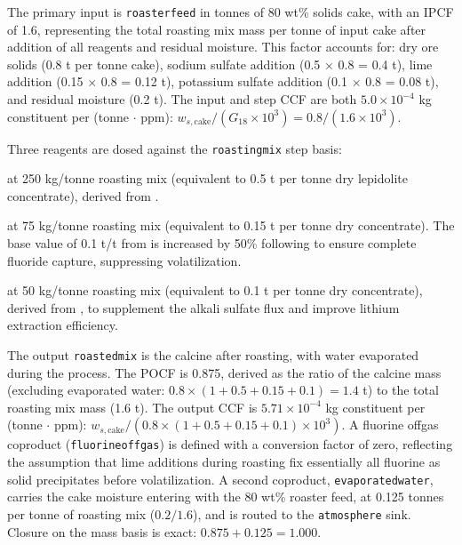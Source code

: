 \documentclass{article}
\renewcommand\_{\textunderscore\allowbreak}
\begin{document}
The primary input is \texttt{roaster\_feed} in tonnes of 80 wt\% solids cake, with an IPCF of 1.6, representing the total roasting mix mass per tonne of input cake after addition of all reagents and residual moisture. This factor accounts for: dry ore solids (0.8 t per tonne cake), sodium sulfate addition (0.5 $\times$ 0.8 = 0.4 t), lime addition (0.15 $\times$ 0.8 = 0.12 t), potassium sulfate addition (0.1 $\times$ 0.8 = 0.08 t), and residual moisture (0.2 t). The input and step CCF are both $5.0 \times 10^{-4}$ kg constituent per (tonne $\cdot$ ppm): $w_{s,\text{cake}} / (G_{18} \times 10^3) = 0.8 / (1.6 \times 10^3)$.

Three reagents are dosed against the \texttt{roasting\_mix} step basis:
\begin{description}[noitemsep, topsep=0pt]
\item[\textbullet\enskip Sodium sulfate (\ce{Na2SO4})] at 250 kg/tonne roasting mix (equivalent to 0.5 t per tonne dry lepidolite concentrate), derived from \citet{yanExtractionLithiumLepidolite2012}.
\item[\textbullet\enskip Lime (\ce{CaO})] at 75 kg/tonne roasting mix (equivalent to 0.15 t per tonne dry concentrate). The base value of 0.1 t/t from \citet{yanExtractionLithiumLepidolite2012} is increased by 50\% following \citet{luongFactorsAffectingExtraction2013} to ensure complete fluoride capture, suppressing  volatilization.
\item[\textbullet\enskip Potassium sulfate (\ce{K2SO4})] at 50 kg/tonne roasting mix (equivalent to 0.1 t per tonne dry concentrate), derived from \citet{yanExtractionLithiumLepidolite2012}, to supplement the alkali sulfate flux and improve lithium extraction efficiency.
\end{description}
The output \texttt{roasted\_mix} is the calcine after roasting, with water evaporated during the process. The POCF is 0.875, derived as the ratio of the calcine mass (excluding evaporated water: $0.8 \times (1 + 0.5 + 0.15 + 0.1) = 1.4$ t) to the total roasting mix mass (1.6 t). The output CCF is $5.71 \times 10^{-4}$ kg constituent per (tonne $\cdot$ ppm): $w_{s,\text{cake}} / (0.8 \times (1 + 0.5 + 0.15 + 0.1) \times 10^3)$. A fluorine offgas coproduct (\texttt{fluorine\_offgas}) is defined with a conversion factor of zero, reflecting the assumption that lime additions during roasting fix essentially all fluorine as solid precipitates before volatilization.
A second coproduct, \texttt{evaporated\_water}, carries the cake moisture entering with the 80 wt\% roaster feed, at 0.125 tonnes per tonne of roasting mix ($0.2/1.6$), and is routed to the \texttt{atmosphere} sink. Closure on the mass basis is exact: $0.875+0.125=1.000$.
\end{document}
